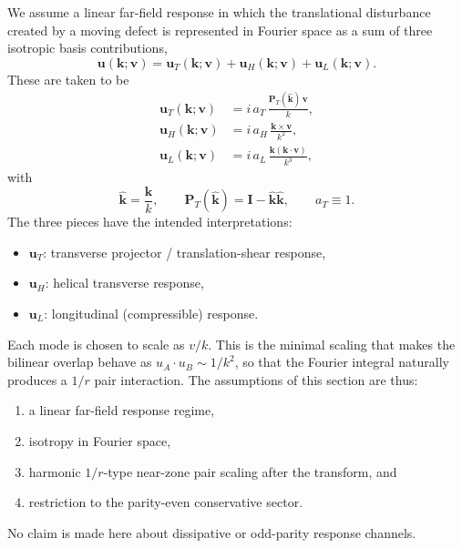 \documentclass[11pt]{article}
\begin{document}
We assume a linear far-field response in which the translational disturbance created by a
moving defect is represented in Fourier space as a sum of three isotropic basis
contributions,
\begin{equation}
\mathbf u(\mathbf k;\mathbf v)
=
\mathbf u_T(\mathbf k;\mathbf v)
+
\mathbf u_H(\mathbf k;\mathbf v)
+
\mathbf u_L(\mathbf k;\mathbf v).
\label{eq:wake-total-basis}
\end{equation}
These are taken to be
\begin{align}
\mathbf u_T(\mathbf k;\mathbf v)
&=
i\,a_T\,
\frac{\mathbf P_T(\hat{\mathbf k})\,\mathbf v}{k},
\label{eq:wake-uT}
\\[3pt]
\mathbf u_H(\mathbf k;\mathbf v)
&=
i\,a_H\,
\frac{\mathbf k\times \mathbf v}{k^2},
\label{eq:wake-uH}
\\[3pt]
\mathbf u_L(\mathbf k;\mathbf v)
&=
i\,a_L\,
\frac{\mathbf k(\mathbf k\!\cdot\!\mathbf v)}{k^3},
\label{eq:wake-uL}
\end{align}
with
\begin{equation}
\hat{\mathbf k}=\frac{\mathbf k}{k},
\qquad
\mathbf P_T(\hat{\mathbf k})=\mathbf I-\hat{\mathbf k}\hat{\mathbf k},
\qquad
a_T\equiv 1.
\label{eq:wake-projectors}
\end{equation}
The three pieces have the intended interpretations:
\begin{itemize}[leftmargin=1.5em]
  \item \(\mathbf u_T\): transverse projector / translation-shear response,
  \item \(\mathbf u_H\): helical transverse response,
  \item \(\mathbf u_L\): longitudinal (compressible) response.
\end{itemize}

Each mode is chosen to scale as \(v/k\). This is the minimal scaling that makes the
bilinear overlap behave as \(u_A\!\cdot\!u_B\sim 1/k^2\), so that the Fourier integral
naturally produces a \(1/r\) pair interaction. The assumptions of this section are thus:
\begin{enumerate}[leftmargin=1.5em]
  \item a linear far-field response regime,
  \item isotropy in Fourier space,
  \item harmonic \(1/r\)-type near-zone pair scaling after the transform, and
  \item restriction to the parity-even conservative sector.
\end{enumerate}
No claim is made here about dissipative or odd-parity response channels.
\end{document}

